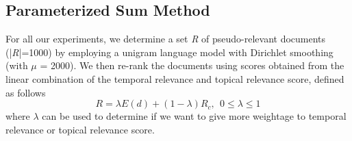 \documentclass{sig-alternate}
\begin{document}
\subsection{Parameterized Sum Method}\label{linear_comb}
 For all our experiments, we determine a set \textit{R} of pseudo-relevant documents (|\textit{R}|=1000) by employing a unigram language model with Dirichlet smoothing~\cite{lm} (with $\mu$ = 2000). We then re-rank the documents using scores obtained from the linear combination of the temporal relevance and topical relevance score, defined as follows
 \begin{equation}\label{eq:6}
 R = \lambda E(d) + (1 - \lambda) R_{c}, \ \ 0 \leq \lambda \leq 1
 \end{equation}
where $\lambda$ can be used to determine if we want to give more weightage to temporal relevance or topical relevance score.
\end{document}
